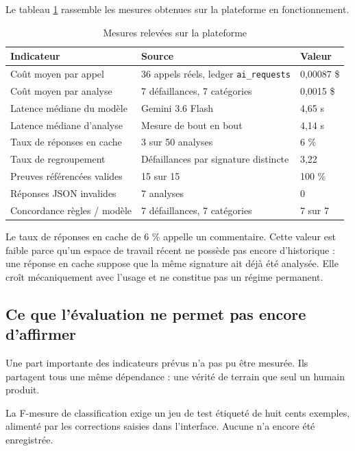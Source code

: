\documentclass[12pt,a4paper,oneside]{report}
\begin{document}
Le tableau \ref{tab:resultats} rassemble les mesures obtenues sur la plateforme
en fonctionnement.

\begin{table}[htbp]
\centering
\caption{Mesures relevées sur la plateforme}
\label{tab:resultats}
\small
\begin{tabularx}{\textwidth}{@{}lXl@{}}
\toprule
\textbf{Indicateur} & \textbf{Source} & \textbf{Valeur} \\
\midrule
Coût moyen par appel & 36 appels réels, ledger \texttt{ai\_requests} & 0,00087 \$ \\
Coût moyen par analyse & 7 défaillances, 7 catégories & 0,0015 \$ \\
Latence médiane du modèle & Gemini 3.6 Flash & 4,65 s \\
Latence médiane d'analyse & Mesure de bout en bout & 4,14 s \\
Taux de réponses en cache & 3 sur 50 analyses & 6 \% \\
Taux de regroupement & Défaillances par signature distincte & 3,22 \\
Preuves référencées valides & 15 sur 15 & 100 \% \\
Réponses JSON invalides & 7 analyses & 0 \\
Concordance règles / modèle & 7 défaillances, 7 catégories & 7 sur 7 \\
\bottomrule
\end{tabularx}
\end{table}

Le taux de réponses en cache de 6 \% appelle un commentaire. Cette valeur est
faible parce qu'un espace de travail récent ne possède pas encore d'historique :
une réponse en cache suppose que la même signature ait déjà été analysée. Elle
croît mécaniquement avec l'usage et ne constitue pas un régime permanent.

\subsection{Ce que l'évaluation ne permet pas encore d'affirmer}

Une part importante des indicateurs prévus n'a pas pu être mesurée. Ils partagent
tous une même dépendance : une vérité de terrain que seul un humain produit.

La F-mesure de classification exige un jeu de test étiqueté de huit cents
exemples, alimenté par les corrections saisies dans l'interface. Aucune n'a
encore été enregistrée.
\end{document}
